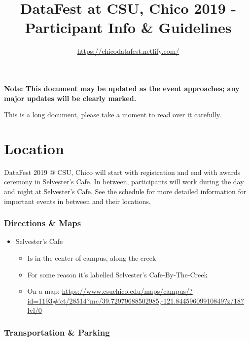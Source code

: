 \documentclass[]{article}
\title{DataFest at CSU, Chico 2019 - Participant Info \& Guidelines}
\subtitle{\url{https://chicodatafest.netlify.com/}}
\author{}
\date{}
\providecommand{\tightlist}{%
  \setlength{\itemsep}{0pt}\setlength{\parskip}{0pt}}
\begin{document}
\maketitle

\textbf{Note: This document may be updated as the event approaches; any
major updates will be clearly marked.}

This is a long document, please take a moment to read over it carefully.

\hypertarget{location}{%
\section{Location}\label{location}}

DataFest 2019 @ CSU, Chico will start with registration and end with
awards ceremony in
\href{https://www.csuchico.edu/aaspace/commonspaces/selv/index.shtml}{Selvester's
Cafe}. In between, participants will work during the day and night at
Selvester's Cafe. See the schedule for more detailed information for
important events in between and their locations.

\hypertarget{directions-maps}{%
\subsubsection{Directions \& Maps}\label{directions-maps}}

\begin{itemize}
\tightlist
\item
  Selvester's Cafe

  \begin{itemize}
  \tightlist
  \item
    Is in the center of campus, along the creek
  \item
    For some reason it's labelled Selvester's Cafe-By-The-Creek
  \item
    On a map:
    \url{https://www.csuchico.edu/maps/campus/?id=1193\#!ct/28514?mc/39.72979688502985,-121.84459609910849?z/18?lvl/0}
  \end{itemize}
\end{itemize}

\hypertarget{transportation-parking}{%
\subsubsection{Transportation \& Parking}\label{transportation-parking}}
\end{document}
